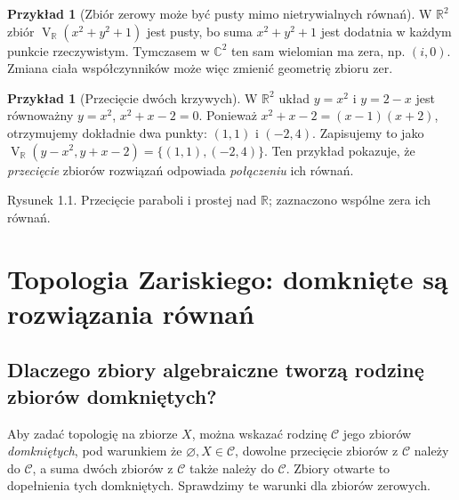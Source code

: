 \documentclass[11pt,a4paper,openany]{report}
\numberwithin{equation}{section}
\theoremstyle{plain}
\theoremstyle{definition}
\newtheorem{przyklad}[twierdzenie]{Przykład}
\theoremstyle{remark}
\newcommand{\R}{\mathbb R}
\newcommand{\C}{\mathbb C}
\newcommand{\V}{\operatorname V}
\begin{document}
\begin{przyklad}[Zbiór zerowy może być pusty mimo nietrywialnych równań]
W $\R^2$ zbiór $\V_{\R}(x^2+y^2+1)$ jest pusty, bo suma
$x^2+y^2+1$ jest dodatnia w każdym punkcie rzeczywistym.
Tymczasem w $\C^2$ ten sam wielomian ma zera, np. $(i,0)$.
Zmiana ciała współczynników może więc zmienić geometrię zbioru zer.
\end{przyklad}

\begin{przyklad}[Przecięcie dwóch krzywych]
W $\R^2$ układ $y=x^2$ i $y=2-x$ jest równoważny
$y=x^2$, $x^2+x-2=0$. Ponieważ
$x^2+x-2=(x-1)(x+2)$, otrzymujemy dokładnie dwa punkty:
$(1,1)$ i $(-2,4)$. Zapisujemy to jako
$\V_{\R}(y-x^2,y+x-2)=\{(1,1),(-2,4)\}$.
Ten przykład pokazuje, że \emph{przecięcie} zbiorów rozwiązań odpowiada
\emph{połączeniu} ich równań.
\end{przyklad}

\begin{center}
\end{center}
\begin{center}\small Rysunek 1.1. Przecięcie paraboli i prostej nad $\R$; zaznaczono wspólne zera ich równań.\end{center}

\section{Topologia Zariskiego: domknięte są rozwiązania równań}

\subsection{Dlaczego zbiory algebraiczne tworzą rodzinę zbiorów domkniętych?}

Aby zadać topologię na zbiorze $X$, można wskazać rodzinę
$\mathcal C$ jego zbiorów \emph{domkniętych}, pod warunkiem że
$\varnothing,X\in\mathcal C$, dowolne przecięcie zbiorów z
$\mathcal C$ należy do $\mathcal C$, a suma dwóch zbiorów z
$\mathcal C$ także należy do $\mathcal C$. Zbiory otwarte to dopełnienia
tych domkniętych. Sprawdzimy te warunki dla zbiorów zerowych.
\end{document}
